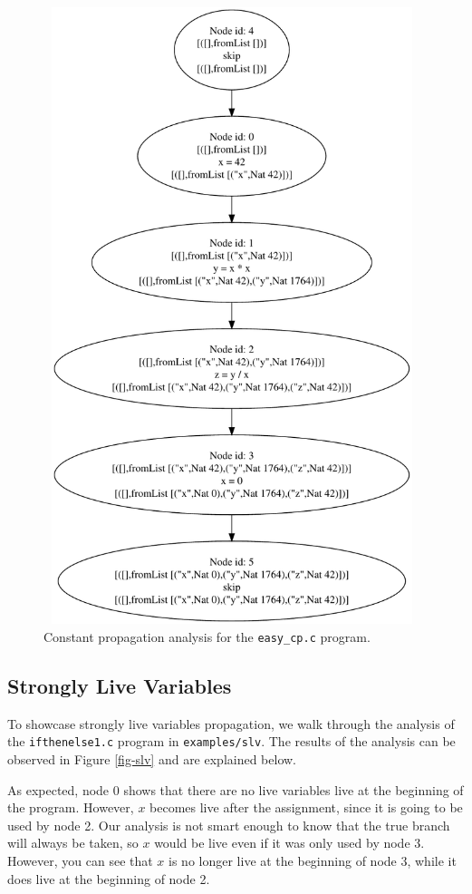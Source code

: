 \documentclass{article}
\begin{document}
\begin{figure}
\centering
\includegraphics[width=11cm, height=18cm]{cp_easy}
\caption{Constant propagation analysis for the \texttt{easy\_cp.c} program.}
\label{fig-cp}
\end{figure}

\subsection*{Strongly Live Variables}

To showcase strongly live variables propagation, we walk through the analysis of the \texttt{ifthenelse1.c} program in \texttt{examples/slv}. The results of the analysis can be observed in Figure \ref{fig-slv} and are explained below.

As expected, node 0 shows that there are no live variables live at the beginning of the program. However, $x$ becomes live after the assignment, since it is going to be used by node 2. Our analysis is not smart enough to know that the true branch will always be taken, so $x$ would be live even if it was only used by node 3. However, you can see that $x$ is no longer live at the beginning of node 3, while it does live at the beginning of node 2.
\end{document}
